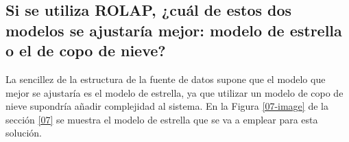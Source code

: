 \medskip
\subsection{Si se utiliza ROLAP, ¿cuál de estos dos modelos se ajustaría mejor: modelo de estrella o el de copo de nieve?}
\label{05}
La sencillez de la estructura de la fuente de datos supone que el modelo que mejor se ajustaría es el modelo de estrella, ya que utilizar un modelo de copo de nieve supondría añadir complejidad al sistema. En la Figura \ref{07-image} de la sección \ref{07} se muestra el modelo de estrella que se va a emplear para esta solución.
